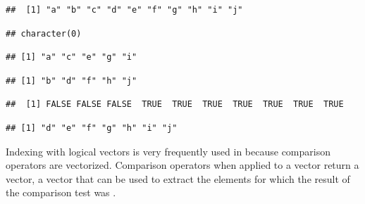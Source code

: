 \documentclass[krantz2]{krantz}\usepackage{knitr}%
\begin{document}
\begin{knitrout}\footnotesize
{}\color{fgcolor}\begin{kframe}
\begin{alltt}
\hlstd{a[}\hlstd{]}
\end{alltt}
\begin{verbatim}
##  [1] "a" "b" "c" "d" "e" "f" "g" "h" "i" "j"
\end{verbatim}
\begin{alltt}
\hlstd{a[}\hlstd{]}
\end{alltt}
\begin{verbatim}
## character(0)
\end{verbatim}
\begin{alltt}
\hlstd{a[}\hlstd{(}\hlstd{,} \hlstd{)]}
\end{alltt}
\begin{verbatim}
## [1] "a" "c" "e" "g" "i"
\end{verbatim}
\begin{alltt}
\hlstd{a[}\hlstd{(}\hlstd{,} \hlstd{)]}
\end{alltt}
\begin{verbatim}
## [1] "b" "d" "f" "h" "j"
\end{verbatim}
\begin{alltt}
 \hlopt{>} 
\end{alltt}
\begin{verbatim}
##  [1] FALSE FALSE FALSE  TRUE  TRUE  TRUE  TRUE  TRUE  TRUE  TRUE
\end{verbatim}
\begin{alltt}
\hlstd{a[a} \hlopt{>} \hlstd{]}
\end{alltt}
\begin{verbatim}
## [1] "d" "e" "f" "g" "h" "i" "j"
\end{verbatim}
\end{kframe}
\end{knitrout}

Indexing with logical vectors is very frequently used in \Rlang because comparison operators are vectorized. Comparison operators  when applied to a vector return a  vector, a vector that can be used to extract the elements for which the result of the comparison test was .
\end{document}
